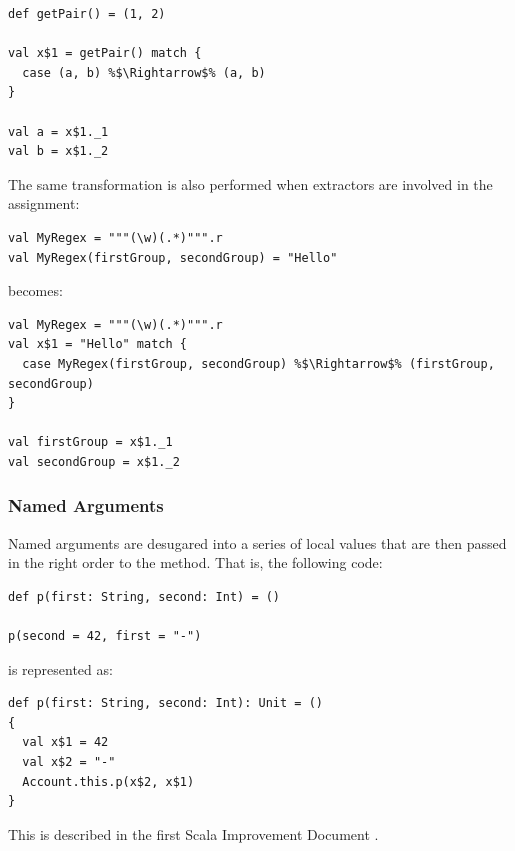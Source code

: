 \begin{lstlisting}
def getPair() = (1, 2)

val x$1 = getPair() match {
  case (a, b) %$\Rightarrow$% (a, b)
}

val a = x$1._1
val b = x$1._2
\end{lstlisting}

The same transformation is also performed when extractors are involved in the assignment:

\begin{lstlisting}
val MyRegex = """(\w)(.*)""".r
val MyRegex(firstGroup, secondGroup) = "Hello"
\end{lstlisting}

becomes:

\begin{lstlisting}
val MyRegex = """(\w)(.*)""".r
val x$1 = "Hello" match {
  case MyRegex(firstGroup, secondGroup) %$\Rightarrow$% (firstGroup, secondGroup)
}

val firstGroup = x$1._1
val secondGroup = x$1._2
\end{lstlisting}

\subsubsection*{Named Arguments}

Named arguments are desugared into a series of local values that are then passed in the right order to the method. That is, the following code:

\begin{lstlisting}
def p(first: String, second: Int) = ()

p(second = 42, first = "-")      
\end{lstlisting}

is represented as:

\begin{lstlisting}
def p(first: String, second: Int): Unit = ()
{
  val x$1 = 42
  val x$2 = "-"
  Account.this.p(x$2, x$1)
}
\end{lstlisting}

This is described in the first Scala Improvement Document \cite{SID1}.



